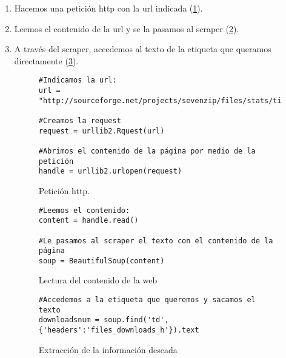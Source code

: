 \begin{enumerate}

\item Hacemos una petición http con la url indicada (\ref{fig:httprequest}).

\item Leemos el contenido de la url y se la pasamos al scraper (\ref{fig:read}).

\item A través del scraper, accedemos al texto de la etiqueta que queramos directamente (\ref{fig:extract}).

\clearpage

\begin{figure}
\begin{verbatim}
#Indicamos la url:
url = "http://sourceforge.net/projects/sevenzip/files/stats/timeline"

#Creamos la request
request = urllib2.Rquest(url)

#Abrimos el contenido de la página por medio de la petición
handle = urllib2.urlopen(request)
\end{verbatim}
\caption{Petición \textsf{http}.}
\label{fig:httprequest}
\end{figure}

\begin{figure}
\begin{verbatim}
#Leemos el contenido:
content = handle.read()

#Le pasamos al scraper el texto con el contenido de la página
soup = BeautifulSoup(content)

\end{verbatim}
\caption{Lectura del contenido de la web}
\label{fig:read}
\end{figure}

\begin{figure}
\begin{verbatim}
#Accedemos a la etiqueta que queremos y sacamos el texto
downloadsnum = soup.find('td', {'headers':'files_downloads_h'}).text

\end{verbatim}
\caption{Extracción de la información deseada}
\label{fig:extract}
\end{figure}


\end{enumerate}



